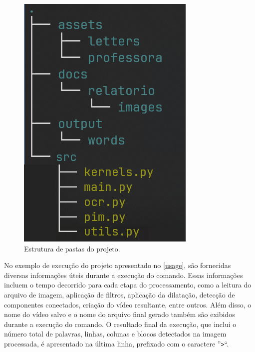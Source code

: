 \documentclass[english, 
               brazil, 
               bsc] %
               {dcomp-abntex2}
\begin{document}
\begin{figure}[htb]
\caption{\small Estrutura de pastas do projeto.}
\label{folders}
    \begin{center}
    \includegraphics[scale=0.65]{./images/folders.png}
    \end{center}
\end{figure}

No exemplo de execução do projeto apresentado no \autoref{usage}, são fornecidas diversas informações úteis durante a execução do comando. Essas informações incluem o tempo decorrido para cada etapa do processamento, como a leitura do arquivo de imagem, aplicação de filtros, aplicação da dilatação, detecção de componentes conectados, criação do vídeo resultante, entre outros. Além disso, o nome do vídeo salvo e o nome do arquivo final gerado também são exibidos durante a execução do comando. O resultado final da execução, que inclui o número total de palavras, linhas, colunas e blocos detectados na imagem processada, é apresentado na última linha, prefixado com o caractere ''\texttt{>}``.
\end{document}

